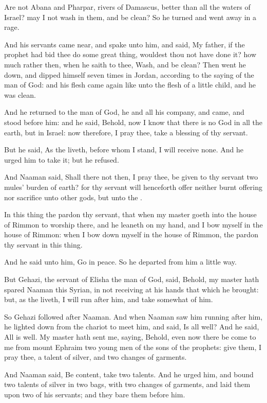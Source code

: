 \verse Are not Abana and Pharpar, rivers of Damascus, better than all the waters of Israel? may I not wash in them, and be clean? So he turned and went away in a rage.

\verse And his servants came near, and spake unto him, and said, My father, if the prophet had bid thee do some great thing, wouldest thou not have done it? how much rather then, when he saith to thee, Wash, and be clean?  \verse Then went he down, and dipped himself seven times in Jordan, according to the saying of the man of God: and his flesh came again like unto the flesh of a little child, and he was clean.

\verse And he returned to the man of God, he and all his company, and came, and stood before him: and he said, Behold, now I know that there is no God in all the earth, but in Israel: now therefore, I pray thee, take a blessing of thy servant.

\verse But he said, As the \LORD liveth, before whom I stand, I will receive none. And he urged him to take it; but he refused.

\verse And Naaman said, Shall there not then, I pray thee, be given to thy servant two mules' burden of earth? for thy servant will henceforth offer neither burnt offering nor sacrifice unto other gods, but unto the \LORD.

\verse In this thing the \LORD pardon thy servant, that when my master goeth into the house of Rimmon to worship there, and he leaneth on my hand, and I bow myself in the house of Rimmon: when I bow down myself in the house of Rimmon, the \LORD pardon thy servant in this thing.

\verse And he said unto him, Go in peace. So he departed from him a little way.

\verse But Gehazi, the servant of Elisha the man of God, said, Behold, my master hath spared Naaman this Syrian, in not receiving at his hands that which he brought: but, as the \LORD liveth, I will run after him, and take somewhat of him.

\verse So Gehazi followed after Naaman. And when Naaman saw him running after him, he lighted down from the chariot to meet him, and said, Is all well?  \verse And he said, All is well. My master hath sent me, saying, Behold, even now there be come to me from mount Ephraim two young men of the sons of the prophets: give them, I pray thee, a talent of silver, and two changes of garments.

\verse And Naaman said, Be content, take two talents. And he urged him, and bound two talents of silver in two bags, with two changes of garments, and laid them upon two of his servants; and they bare them before him.

